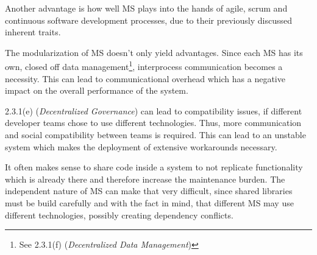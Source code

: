 Another advantage is how well MS plays into the hands of agile, scrum and continuous software development processes, due to their previously discussed inherent traits.

The modularization of MS doesn't only yield advantages. Since each MS has its own, closed off data management\footnote{See 2.3.1(f) (\emph{Decentralized Data Management})}, interprocess communication becomes a necessity. This can lead to communicational overhead which has a negative impact on the overall performance of the system\cite{Wolff16}.

2.3.1(e) (\emph{Decentralized Governance}) can lead to compatibility issues, if different developer teams chose to use different technologies. Thus, more communication and social compatibility between teams is required. This can lead to an unstable system which makes the deployment of extensive workarounds necessary\cite{Riggins15}.

It often makes sense to share code inside a system to not replicate functionality which is already there and therefore increase the maintenance burden. The independent nature of MS can make that very difficult, since shared libraries must be build carefully and with the fact in mind, that different MS may use different technologies, possibly creating dependency conflicts.


